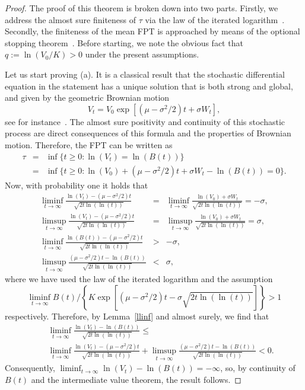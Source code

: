 \documentclass[12pt]{article}
\theoremstyle{definition}
\begin{document}
\begin{proof}
The proof of this theorem is broken down into two parts. Firstly, we address the almost sure finiteness of $\tau$ via the law of the iterated logarithm~\cite{karatzas1991brownian,khintchine1924satz,brownian2010morters,brownian2014sp}. Secondly, the finiteness of the mean FPT is approached by means of the optional stopping theorem~\cite{handbook2012borodin,karatzas1991brownian,brownian2010morters,brownian2014sp}. Before starting, we note the obvious fact that $q:=\ln(V_0/K)>0$ under the present assumptions.

Let us start proving (a).
It is a classical result that the stochastic differential equation in the statement has a unique solution that is both strong and global, and given by the geometric Brownian motion
$$
V_t=V_0 \exp \left[ (\mu - \sigma^2/2)t + \sigma W_t \right],
$$
see for instance~\cite{oksendal2013}. The almost sure positivity and continuity of this stochastic process are direct consequences of this formula and the properties of Brownian motion. Therefore, the FPT can be written as
\begin{eqnarray}\nonumber
\tau &=& \inf \{t \ge 0 : \ln(V_t) = \ln(B(t))\}\\ \nonumber
&=& \inf \{t \ge 0 : \ln(V_0) + (\mu - \sigma^2/2)t + \sigma W_t - \ln(B(t)) =0\}.
\end{eqnarray}
Now, with probability one it holds that
\begin{eqnarray}\nonumber
\liminf_{t \to \infty} \frac{\ln(V_t)-(\mu - \sigma^2/2)t}{\sqrt{2t \ln(\ln(t))}} &=& \liminf_{t \to \infty} \frac{\ln(V_0) + \sigma W_t}{\sqrt{2t \ln(\ln(t))}}=-\sigma,\\ \nonumber
\limsup_{t \to \infty} \frac{\ln(V_t)-(\mu - \sigma^2/2)t}{\sqrt{2t \ln(\ln(t))}} &=& \limsup_{t \to \infty} \frac{\ln(V_0) + \sigma W_t}{\sqrt{2t \ln(\ln(t))}}=\sigma,\\ \nonumber
\liminf_{t \to \infty} \frac{\ln(B(t))-(\mu - \sigma^2/2)t}{\sqrt{2t \ln(\ln(t))}} &>& -\sigma,
\\ \nonumber
\limsup_{t \to \infty} \frac{(\mu - \sigma^2/2)t-\ln(B(t))}{\sqrt{2t \ln(\ln(t))}} &<& \sigma,
\end{eqnarray}
where we have used the law of the iterated logarithm and the assumption
$$
\liminf_{t \to \infty} B(t) \Big/ \left\{ K \exp \left[(\mu-\sigma^2/2)t - \sigma \sqrt{2t \ln(\ln(t))}\right] \right\} >1
$$
respectively.
Therefore, by Lemma~\ref{llinf} and almost surely, we find that
\begin{eqnarray}\nonumber
&& \liminf_{t \to \infty} \frac{\ln(V_t)-\ln(B(t))}{\sqrt{2t \ln(\ln(t))}} \le \\ \nonumber
&& \liminf_{t \to \infty} \frac{\ln(V_t)-(\mu - \sigma^2/2)t}{\sqrt{2t \ln(\ln(t))}} + \limsup_{t \to \infty} \frac{(\mu - \sigma^2/2)t-\ln(B(t))}{\sqrt{2t \ln(\ln(t))}}<0.
\end{eqnarray}
Consequently, $\liminf_{t \to \infty} \ln(V_t)-\ln(B(t))=-\infty$, so, by continuity of $B(t)$ and the intermediate value theorem, the result follows.


\end{proof}
\end{document}
